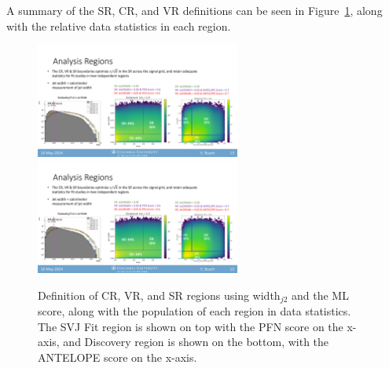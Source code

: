 A summary of the SR, CR, and VR definitions can be seen in Figure~\ref{fig:crvrsr_2d}, along with the relative data statistics in each region.
\begin{figure}[!htbp]
\centering
    \includegraphics[width=0.6\textwidth]{figures/eventsel/crvrsr_2d}
    \includegraphics[width=0.6\textwidth]{figures/eventsel/crvrsr_2d_antelope}
    \caption{Definition of CR, VR, and SR regions using width$_{j2}$ and the ML score, along with the population of each region in data statistics. The SVJ Fit region is shown on top with the PFN score on the x-axis, and Discovery region is shown on the bottom, with the ANTELOPE score on the x-axis.
    \label{fig:crvrsr_2d}}
\end{figure}



